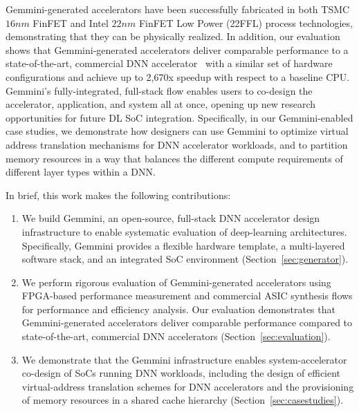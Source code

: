 
Gemmini-generated accelerators have been successfully fabricated in both TSMC
$16nm$ FinFET and Intel $22nm$ FinFET Low Power (22FFL) process technologies, demonstrating that they can be physically realized.
In addition, our evaluation shows that Gemmini-generated accelerators deliver comparable
performance to a state-of-the-art, commercial DNN
accelerator~\cite{nvdla-hotchips} with a similar set of hardware configurations and achieve up to 2,670x speedup with respect to a baseline CPU.
Gemmini's fully-integrated, full-stack flow enables users to co-design the accelerator, application, and system all at once, opening up new research opportunities for future DL SoC integration. Specifically, in our Gemmini-enabled case studies, we demonstrate how designers can use Gemmini to optimize virtual address translation mechanisms for DNN accelerator workloads, and to partition memory resources in a way that balances the different compute requirements of different layer types within a DNN.


In brief, this work makes the following contributions:

\begin{enumerate}
\item We build Gemmini, an open-source, full-stack DNN accelerator design
infrastructure to enable systematic evaluation of deep-learning architectures.
Specifically, Gemmini provides a flexible hardware template, a multi-layered
software stack, and an integrated SoC environment (Section~\ref{sec:generator}).

\item We perform rigorous evaluation of Gemmini-generated accelerators using FPGA-based performance measurement and commercial ASIC synthesis flows for performance and efficiency analysis. Our evaluation demonstrates that Gemmini-generated accelerators deliver comparable performance compared to state-of-the-art, commercial DNN accelerators (Section~\ref{sec:evaluation}). %

\item We demonstrate that the Gemmini infrastructure enables system-accelerator co-design of SoCs running DNN workloads, including the design of efficient virtual-address translation schemes for DNN accelerators and the provisioning of memory resources in a shared cache hierarchy (Section~\ref{sec:casestudies}).
\end{enumerate}


